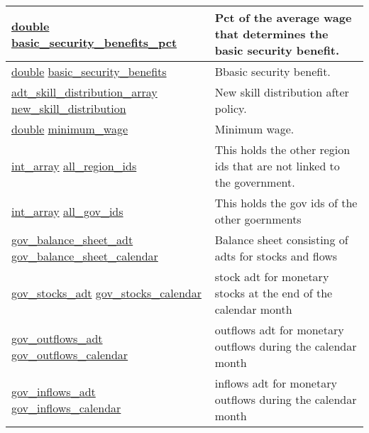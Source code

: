 \documentclass[a4paper,11pt]{article}
\begin{document}
\begin{longtable}[H!]{ll}
\midrule
\parbox{5cm}{\url{double} \url{basic_security_benefits_pct}}  & \parbox{10cm}{Pct of the average wage that determines the basic security benefit.} \\
\midrule
\parbox{5cm}{\url{double} \url{basic_security_benefits}}  & \parbox{10cm}{Bbasic security benefit.} \\
\midrule
\parbox{5cm}{\url{adt_skill_distribution_array} \url{new_skill_distribution}}  & \parbox{10cm}{New skill distribution after policy.} \\
\midrule
\parbox{5cm}{\url{double} \url{minimum_wage}}  & \parbox{10cm}{Minimum wage.} \\
\midrule
\parbox{5cm}{\url{int_array} \url{all_region_ids}}  & \parbox{10cm}{This holds the other region ids that are not linked to the government.} \\
\midrule
\parbox{5cm}{\url{int_array} \url{all_gov_ids}}  & \parbox{10cm}{This holds the gov ids of the other goernments} \\
\midrule
\parbox{5cm}{\url{gov_balance_sheet_adt} \url{gov_balance_sheet_calendar}}  & \parbox{10cm}{Balance sheet consisting of adts for stocks and flows} \\
\midrule
\parbox{5cm}{\url{gov_stocks_adt} \url{gov_stocks_calendar}}  & \parbox{10cm}{stock adt for monetary stocks at the end of the calendar month} \\
\midrule
\parbox{5cm}{\url{gov_outflows_adt} \url{gov_outflows_calendar}}  & \parbox{10cm}{outflows adt for monetary outflows during the calendar month} \\
\midrule
\parbox{5cm}{\url{gov_inflows_adt} \url{gov_inflows_calendar}}  & \parbox{10cm}{inflows adt for monetary outflows during the calendar month} \\
\end{longtable}
\end{document}
